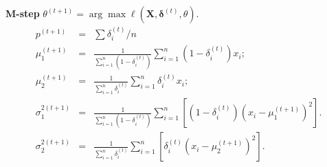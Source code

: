 \documentclass[]{article}
\begin{document}
\textbf{M-step}
\(\theta^{(t+1)} = \arg\max\ell( \mathbf{X}, \mathbf{\delta}^{(t)}, \theta )\).
\begin{eqnarray*}
{p}^{(t+1)} &= &\sum \delta_i^{(t)}/n \\
{\mu}_1^{(t+1)} &= & \frac{1}{\sum_{i=1}^n (1-\delta^{(t)}_i)} \sum_{i=1}^n (1-\delta^{(t)}_i) x_i;\\
{\mu}_2^{(t+1)} &= & \frac{1}{\sum_{i=1}^n \delta^{(t)}_i} \sum_{i=1}^n \delta^{(t)}_i x_i;\\
{\sigma}_1^{2(t+1)} &= & \frac{1}{\sum_{i=1}^n (1-\delta^{(t)}_i)}
\sum_{i=1}^n \left[(1-\delta^{(t)}_i)(x_i-{\mu}_1^{(t+1)})^2\right].\\
{\sigma}_2^{2(t+1)} &= & \frac{1}{\sum_{i=1}^n \delta^{(t)}_i}
\sum_{i=1}^n \left[\delta^{(t)}_i(x_i-{\mu}^{(t+1)}_2)^2\right].
\end{eqnarray*}
\end{document}
